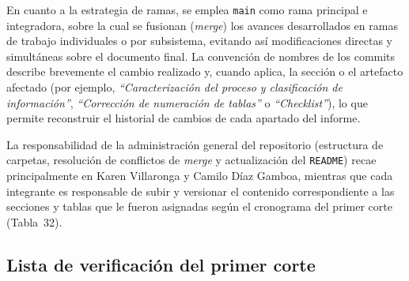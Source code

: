 {En cuanto a la estrategia de ramas, se emplea \texttt{main} como rama principal e integradora, sobre la
cual se fusionan (\textit{merge}) los avances desarrollados en ramas de trabajo individuales o por
subsistema, evitando así modificaciones directas y simultáneas sobre el documento final. La convención
de nombres de los commits describe brevemente el cambio realizado y, cuando aplica, la sección o el
artefacto afectado (por ejemplo, \textit{“Caracterización del proceso y clasificación de información”},
\textit{“Corrección de numeración de tablas”} o \textit{“Checklist”}), lo que permite reconstruir el
historial de cambios de cada apartado del informe.

La responsabilidad de la administración general del repositorio (estructura de carpetas, resolución de
conflictos de \textit{merge} y actualización del \texttt{README}) recae principalmente en
Karen Villaronga y Camilo Díaz Gamboa, mientras que cada integrante es responsable de subir y
versionar el contenido correspondiente a las secciones y tablas que le fueron asignadas según el
cronograma del primer corte (Tabla~32).}

\subsection{Lista de verificación del primer corte}

